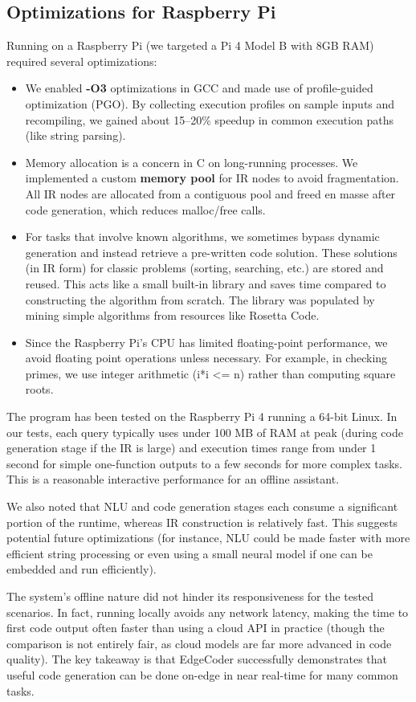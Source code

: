\documentclass[12pt]{article}
\begin{document}
\subsection{Optimizations for Raspberry Pi}
Running on a Raspberry Pi (we targeted a Pi 4 Model B with 8GB RAM) required several optimizations:
\begin{itemize}
    \item We enabled \textbf{-O3} optimizations in GCC and made use of profile-guided optimization (PGO). By collecting execution profiles on sample inputs and recompiling, we gained about 15–20\% speedup in common execution paths (like string parsing).
    \item Memory allocation is a concern in C on long-running processes. We implemented a custom \textbf{memory pool} for IR nodes to avoid fragmentation. All IR nodes are allocated from a contiguous pool and freed en masse after code generation, which reduces malloc/free calls.
    \item For tasks that involve known algorithms, we sometimes bypass dynamic generation and instead retrieve a pre-written code solution. These solutions (in IR form) for classic problems (sorting, searching, etc.) are stored and reused. This acts like a small built-in library and saves time compared to constructing the algorithm from scratch. The library was populated by mining simple algorithms from resources like Rosetta Code.
    \item Since the Raspberry Pi’s CPU has limited floating-point performance, we avoid floating point operations unless necessary. For example, in checking primes, we use integer arithmetic (i*i <= n) rather than computing square roots.
\end{itemize}
The program has been tested on the Raspberry Pi 4 running a 64-bit Linux. In our tests, each query typically uses under 100 MB of RAM at peak (during code generation stage if the IR is large) and execution times range from under 1 second for simple one-function outputs to a few seconds for more complex tasks. This is a reasonable interactive performance for an offline assistant.

We also noted that NLU and code generation stages each consume a significant portion of the runtime, whereas IR construction is relatively fast. This suggests potential future optimizations (for instance, NLU could be made faster with more efficient string processing or even using a small neural model if one can be embedded and run efficiently).

The system’s offline nature did not hinder its responsiveness for the tested scenarios. In fact, running locally avoids any network latency, making the time to first code output often faster than using a cloud API in practice (though the comparison is not entirely fair, as cloud models are far more advanced in code quality). The key takeaway is that EdgeCoder successfully demonstrates that useful code generation can be done on-edge in near real-time for many common tasks.
\end{document}
